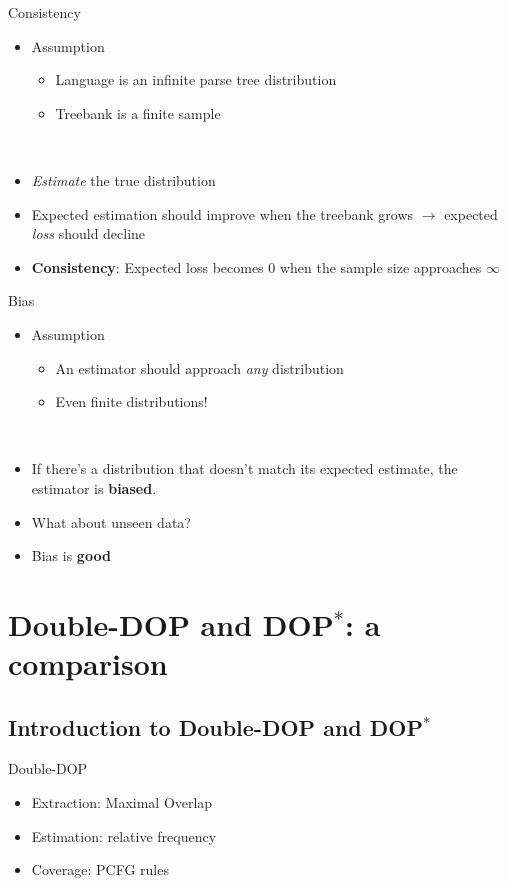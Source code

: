 \documentclass{beamer}
\newcommand{\dops}[0]{DOP$ ^*$}
\newcommand{\ddop}[0]{Double-DOP}
\begin{document}
\begin{frame}{Consistency}

\begin{itemize}
\item Assumption
  \begin{itemize}
  \item Language is an infinite parse tree distribution
  \item Treebank is a finite sample
  \end{itemize}
\\
\item \emph{Estimate} the true distribution
\item Expected estimation should improve when the treebank grows 
$\rightarrow$ expected \emph{loss} should decline
\item {\bf Consistency}: Expected loss becomes 0 when the sample size approaches $\infty$
\end{itemize}
\end{frame}


\begin{frame}{Bias}

\begin{itemize}
\item Assumption
  \begin{itemize}
  \item An estimator should approach \emph{any} distribution
  \item Even finite distributions!
  \end{itemize}
\\
\item If there's a distribution that doesn't match its expected estimate, the estimator is {\bf biased}.
\item What about unseen data?
\item Bias is {\bf good}
\end{itemize}
\end{frame}

\section{\ddop{} and \dops{}: a comparison}

\subsection{Introduction to \ddop{} and \dops{}}
\begin{frame}{\ddop{}}
\begin{itemize}
\item Extraction: Maximal Overlap
\item Estimation: relative frequency 
\item Coverage: PCFG rules
\end{itemize}
\end{frame}
\end{document}
